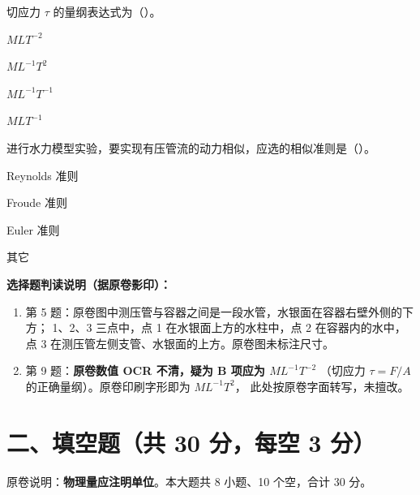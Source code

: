 \begin{ti}
  \item 切应力 $\tau$ 的量纲表达式为（\quad）。\hfill{}
  \begin{choices}
    \item $MLT^{-2}$
    \item $ML^{-1}T^{2}$
    \item $ML^{-1}T^{-1}$
    \item $MLT^{-1}$
  \end{choices}

  \item 进行水力模型实验，要实现有压管流的动力相似，应选的相似准则是（\quad）。\hfill{}
  \begin{choices}
    \item Reynolds 准则
    \item Froude 准则
    \item Euler 准则
    \item 其它
  \end{choices}
\end{ti}

\begin{tishi}
\textbf{选择题判读说明（据原卷影印）：}
\begin{enumerate}
  \item 第 5 题：原卷图中测压管与容器之间是一段水管，水银面在容器右壁外侧的下方；
    1、2、3 三点中，点 1 在水银面上方的水柱中，点 2 在容器内的水中，
    点 3 在测压管左侧支管、水银面的上方。原卷图未标注尺寸。
  \item 第 9 题：\textbf{原卷数值 OCR 不清，疑为 B 项应为 $ML^{-1}T^{-2}$}
    （切应力 $\tau=F/A$ 的正确量纲）。原卷印刷字形即为 $ML^{-1}T^{2}$，
    此处按原卷字面转写，未擅改。
\end{enumerate}
\end{tishi}

\section{二、填空题（共 30 分，每空 3 分）}

\begin{tishi}
原卷说明：\textbf{物理量应注明单位}。本大题共 8 小题、10 个空，合计 30 分。
\end{tishi}

